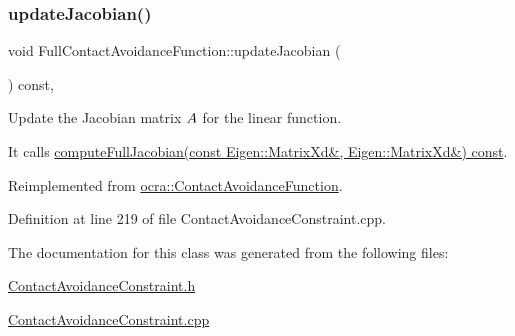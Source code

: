\hypertarget{classocra_1_1FullContactAvoidanceFunction_a91b21004faed7ffa6a51e975abc93797}{}\label{classocra_1_1FullContactAvoidanceFunction_a91b21004faed7ffa6a51e975abc93797} 
\subsubsection{\texorpdfstring{update\+Jacobian()}{updateJacobian()}}
{\footnotesize\ttfamily void Full\+Contact\+Avoidance\+Function\+::update\+Jacobian (\begin{DoxyParamCaption}{ }\end{DoxyParamCaption}) const\hspace{0.3cm}{\ttfamily [protected]}, {\ttfamily [virtual]}}

Update the Jacobian matrix $ A $ for the linear function.

It calls \hyperlink{classocra_1_1ContactAvoidanceFunction_a59994d2c3f364575ecff7fb23b7e10ab}{compute\+Full\+Jacobian(const Eigen\+::\+Matrix\+Xd\&, Eigen\+::\+Matrix\+Xd\&) const}. 

Reimplemented from \hyperlink{classocra_1_1ContactAvoidanceFunction_aca72dc43ecd3d95bb917139ac6ae19c1}{ocra\+::\+Contact\+Avoidance\+Function}.



Definition at line 219 of file Contact\+Avoidance\+Constraint.\+cpp.



The documentation for this class was generated from the following files\+:\begin{DoxyCompactItemize}
\item 
\hyperlink{ContactAvoidanceConstraint_8h}{Contact\+Avoidance\+Constraint.\+h}\item 
\hyperlink{ContactAvoidanceConstraint_8cpp}{Contact\+Avoidance\+Constraint.\+cpp}\end{DoxyCompactItemize}
